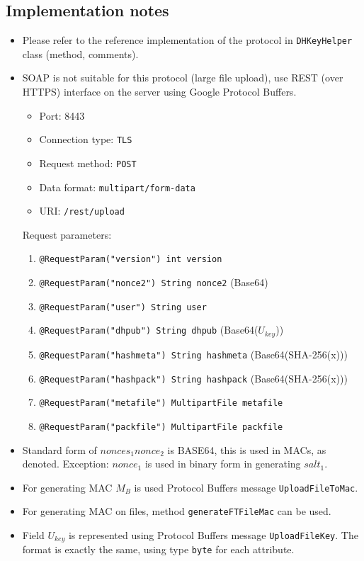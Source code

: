 \documentclass[a4paper,10pt]{article}
\begin{document}
\subsection{Implementation notes}
\begin{itemize}
 \item Please refer to the reference implementation of the protocol in \texttt{DHKeyHelper} class (method, comments).  

 \item SOAP is not suitable for this protocol (large file upload), use REST (over HTTPS) interface on the server using Google Protocol Buffers.
    \begin{itemize}
     \item Port: 8443
     \item Connection type: \texttt{TLS}
     \item Request method: \texttt{POST}
     \item Data format: \texttt{multipart/form-data}
     \item URI: \texttt{/rest/upload}
    \end{itemize}

    Request parameters: 
    \begin{enumerate}
     \item \texttt{@RequestParam("version") int version}
     \item \texttt{@RequestParam("nonce2") String nonce2}\; (Base64)
     \item \texttt{@RequestParam("user") String user}
     \item \texttt{@RequestParam("dhpub") String dhpub}\; (Base64($U_{key}$))
     \item \texttt{@RequestParam("hashmeta") String hashmeta}\; (Base64(SHA-256(x)))
     \item \texttt{@RequestParam("hashpack") String hashpack}\; (Base64(SHA-256(x)))
     \item \texttt{@RequestParam("metafile") MultipartFile metafile}
     \item \texttt{@RequestParam("packfile") MultipartFile packfile}
    \end{enumerate}

 \item Standard form of $nonces_1 nonce_2$ is BASE64, this is used in MACs, as denoted. Exception: $nonce_1$ is used in binary form in 
	generating $salt_1$.
 \item For generating MAC $M_B$ is used Protocol Buffers message \texttt{UploadFileToMac}.
 \item For generating MAC on files, method \texttt{generateFTFileMac} can be used.
 \item Field $U_{key}$ is represented using Protocol Buffers message \texttt{UploadFileKey}. The format is exactly the same,
	    using type \texttt{byte} for each attribute.


\end{itemize}
\end{document}
